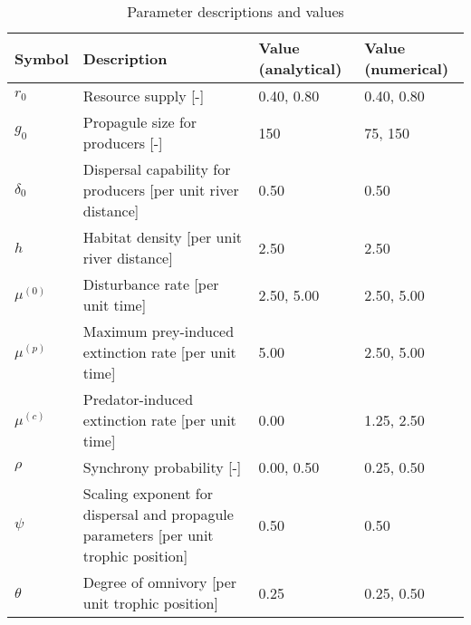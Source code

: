 \begin{table}[ht]
\centering
\caption{Parameter descriptions and values\label{tab:parms}} 
\begingroup\small
\begin{tabularx}{\textwidth}{llll}
  \hline
Symbol & Description & Value (analytical) & Value (numerical) \\ 
  \hline
$r_0$ & Resource supply [-] & 0.40, 0.80 & 0.40, 0.80 \\ 
  $g_0$ & Propagule size for producers [-] & 150 & 75, 150 \\ 
  $\delta_0$ & Dispersal capability for producers [per unit river distance] & 0.50 & 0.50 \\ 
  $h$ & Habitat density [per unit river distance] & 2.50 & 2.50 \\ 
  $\mu^{(0)}$ & Disturbance rate [per unit time] & 2.50, 5.00 & 2.50, 5.00 \\ 
  $\mu^{(p)}$ & Maximum prey-induced extinction rate [per unit time] & 5.00 & 2.50, 5.00 \\ 
  $\mu^{(c)}$ & Predator-induced extinction rate [per unit time] & 0.00 & 1.25, 2.50 \\ 
  $\rho$ & Synchrony probability [-] & 0.00, 0.50 & 0.25, 0.50 \\ 
  $\psi$ & Scaling exponent for dispersal and propagule parameters [per unit trophic position] & 0.50 & 0.50 \\ 
  $\theta$ & Degree of omnivory [per unit trophic position] & 0.25 & 0.25, 0.50 \\ 
   \hline
\end{tabularx}
\endgroup
\end{table}
